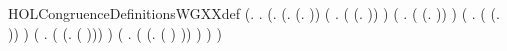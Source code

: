 \begin{SaveVerbatim}{HOLCongruenceDefinitionsWGXXdef}
\HOLTokenTurnstile{}  \HOLSymConst{=}
   (\HOLTokenLambda{}.
        \HOLSymConst{\HOLTokenForall{}}.
            (\HOLSymConst{\HOLTokenForall{}}.
                 (\HOLSymConst{\HOLTokenExists{}}.  \HOLSymConst{=} (\HOLTokenLambda{}. )) \HOLSymConst{\HOLTokenDisj{}}
                 (\HOLSymConst{\HOLTokenExists{}} . ( \HOLSymConst{=} (\HOLTokenLambda{}.  )) \HOLSymConst{\HOLTokenConj{}}  ) \HOLSymConst{\HOLTokenDisj{}}
                 (\HOLSymConst{\HOLTokenExists{}} .
                      ( \HOLSymConst{=} (\HOLTokenLambda{}.   \HOLSymConst{+}  )) \HOLSymConst{\HOLTokenConj{}}   \HOLSymConst{\HOLTokenConj{}}  ) \HOLSymConst{\HOLTokenDisj{}}
                 (\HOLSymConst{\HOLTokenExists{}} .
                      ( \HOLSymConst{=} (\HOLTokenLambda{}.   \HOLSymConst{\ensuremath{\parallel}}  )) \HOLSymConst{\HOLTokenConj{}}   \HOLSymConst{\HOLTokenConj{}}  ) \HOLSymConst{\HOLTokenDisj{}}
                 (\HOLSymConst{\HOLTokenExists{}} . ( \HOLSymConst{=} (\HOLTokenLambda{}. \HOLConst{\ensuremath{\nu}}  ( ))) \HOLSymConst{\HOLTokenConj{}}  ) \HOLSymConst{\HOLTokenDisj{}}
                 (\HOLSymConst{\HOLTokenExists{}} . ( \HOLSymConst{=} (\HOLTokenLambda{}.  ( ) )) \HOLSymConst{\HOLTokenConj{}}  ) \HOLSymConst{\HOLTokenImp{}}
                  ) \HOLSymConst{\HOLTokenImp{}}
             )
\end{SaveVerbatim}
